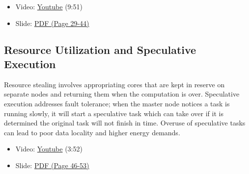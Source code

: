\begin{itemize}
\tightlist
\item
  Video: \href{https://www.youtube.com/watch?v=u9UpgTnOZz4}{Youtube}
  (9:51)
\item
  Slide:
  \href{https://drive.google.com/open?id=0B88HKpainTSfT28zLTdKYWhGdGM}{PDF
  (Page 29-44)}
\end{itemize}

\subsection{Resource Utilization and Speculative
Execution}\label{resource-utilization-and-speculative-execution}

Resource stealing involves appropriating cores that are kept in reserve
on separate nodes and returning them when the computation is over.
Speculative execution addresses fault tolerance; when the master node
notices a task is running slowly, it will start a speculative task which
can take over if it is determined the original task will not finish in
time. Overuse of speculative tasks can lead to poor data locality and
higher energy demands.

\begin{itemize}
\tightlist
\item
  Video: \href{https://www.youtube.com/watch?v=wWyFiqDIYus}{Youtube}
  (3:52)
\end{itemize}

\begin{itemize}
\tightlist
\item
  Slide:
  \href{https://drive.google.com/open?id=0B88HKpainTSfT28zLTdKYWhGdGM}{PDF
  (Page 46-53)}
\end{itemize}
